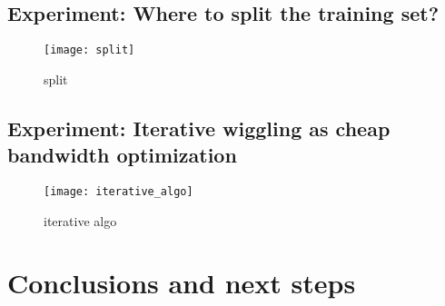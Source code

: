 \documentclass[12pt]{amsart}
\begin{document}
\subsection{Experiment: Where to split the training set?}

\begin{figure}[htp]
    \centering
    \texttt{[image: split]}
    \caption{split}
    \label{fig:split}
\end{figure}

\subsection{Experiment: Iterative wiggling as cheap bandwidth optimization}

\begin{figure}[htp]
    \centering
    \texttt{[image: iterative\_algo]}
    \caption{iterative algo}
    \label{fig:iterative_algo}
\end{figure}

\section{Conclusions and next steps}
\end{document}
